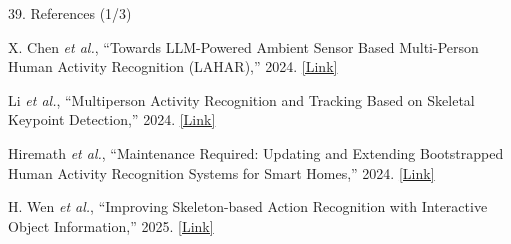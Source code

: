 \documentclass[aspectratio=169,11pt,xcolor=table]{beamer}
\begin{document}
\begin{frame}{39. References (1/3)}

\footnotesize
\color{black}
\raggedright

\begin{list}
    {}
    {
        \setlength{\leftmargin}{0.45cm}
        \setlength{\labelwidth}{0cm}
        \setlength{\labelsep}{0.10cm}
        \setlength{\itemsep}{8pt}
        \setlength{\parsep}{0pt}
        \setlength{\topsep}{0pt}
    }

\item[\textbf{[1]}]
X. Chen \emph{et al.}, ``Towards LLM-Powered Ambient Sensor Based
Multi-Person Human Activity Recognition (LAHAR),'' 2024.
\hspace{2pt}
\href{https://ieeexplore.ieee.org/document/10763542/}
{\textcolor{AmritaMaroon}{[Link]}}

\item[\textbf{[2]}]
Li \emph{et al.}, ``Multiperson Activity Recognition and Tracking
Based on Skeletal Keypoint Detection,'' 2024.
\hspace{2pt}
\href{https://www.researchgate.net/publication/374189243_Multiperson_Activity_Recognition_and_Tracking_Based_on_Skeletal_Keypoint_Detection}
{\textcolor{AmritaMaroon}{[Link]}}

\item[\textbf{[3]}]
Hiremath \emph{et al.}, ``Maintenance Required: Updating and Extending
Bootstrapped Human Activity Recognition Systems for Smart Homes,'' 2024.
\hspace{2pt}
\href{https://arxiv.org/pdf/2406.14446}
{\textcolor{AmritaMaroon}{[Link]}}

\item[\textbf{[4]}]
H. Wen \emph{et al.}, ``Improving Skeleton-based Action Recognition
with Interactive Object Information,'' 2025.
\hspace{2pt}
\href{https://arxiv.org/abs/2501.05066}
{\textcolor{AmritaMaroon}{[Link]}}

\end{list}

\end{frame}


\end{document}
